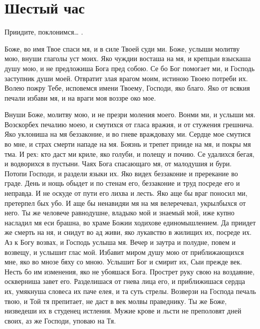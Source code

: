 \section{Шестый час}\begin{mymulticols}



Приидите, поклонимся… .




Боже, во имя Твое спаси мя, и в силе Твоей суди ми. Боже, услыши молитву мою, внуши глаголы уст моих. Яко чуждии восташа на мя, и крепцыи взыскаша душу мою, и не предложиша Бога пред собою. Се бо Бог помогает ми, и Господь заступник души моей. Отвратит злая врагом моим, истиною Твоею потреби их. Волею пожру Тебе, исповемся имени Твоему, Господи, яко благо. Яко от всякия печали избави мя, и на враги моя воззре око мое.




Внуши Боже, молитву мою, и не презри моления моего. Вонми ми, и услыши мя. Возскорбех печалию моею, и смутихся от гласа вражия, и от стужения грешнича. Яко уклониша на мя беззаконие, и во гневе враждоваху ми. Сердце мое смутися во мне, и страх смерти нападе на мя. Боязнь и трепет прииде на мя, и покры мя тма. И рех: кто даст ми криле, яко голуби, и полещу и почию. Се удалихся бегая, и водворихся в пустыни. Чаях Бога спасающаго мя, от малодушия и бури. Потопи Господи, и раздели языки их. Яко видех беззаконие и пререкание во граде. День и нощь обыдет и по стенам его, беззаконие и труд посреде его и неправда. И не оскуде от пути его лихва и лесть. Яко аще бы враг поносил ми, претерпел бых убо. И аще бы ненавидяи мя на мя велеречевал, укрылбыхся от него. Ты же человече равнодушне, владыко мой и знаемый мой, иже купно насладил мя еси брашна, во храме Божии ходихове единомышлением. Да приидет же смерть на ня, и снидут во ад живи, яко лукавство в жилищих их, посреде их. Аз к Богу возвах, и Господь услыша мя. Вечер и заутра и полудне, повем и возвещу, и услышит глас мой. Избавит миром душу мою от приближающихся мне, яко во мнозе бяху со мною. Услышит Бог и смирит их, Сыи прежде век. Несть бо им изменения, яко не убояшася Бога. Прострет руку свою на воздаяние, оскверниша завет его. Разделишася от гнева лица его, и приближишася сердца их, умякнуша словеса их паче елея, и та суть стрелы. Возверзи на Господа печаль твою, и Той тя препитает, не даст в век молвы праведнику. Ты же Боже, низведеши их в студенец истления. Мужие крове и льсти не преполовят дней своих, аз же Господи, уповаю на Тя.



\end{mymulticols}
